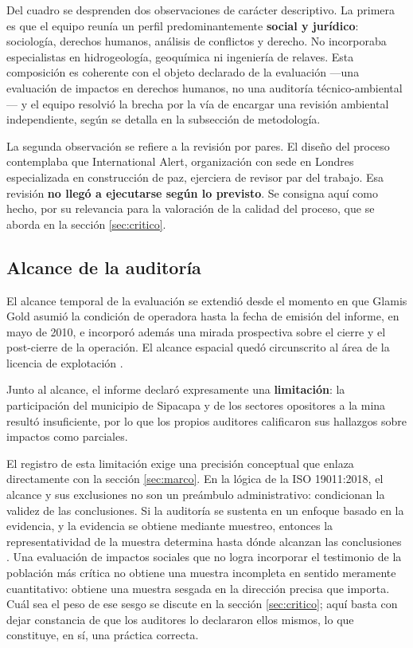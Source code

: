 Del cuadro se desprenden dos observaciones de carácter descriptivo. La primera es
que el equipo reunía un perfil predominantemente \textbf{social y jurídico}:
sociología, derechos humanos, análisis de conflictos y derecho. No incorporaba
especialistas en hidrogeología, geoquímica ni ingeniería de relaves. Esta
composición es coherente con el objeto declarado de la evaluación —una evaluación
de impactos en derechos humanos, no una auditoría técnico-ambiental— y el equipo
resolvió la brecha por la vía de encargar una revisión ambiental independiente,
según se detalla en la subsección de metodología.

La segunda observación se refiere a la revisión por pares. El diseño del proceso
contemplaba que International Alert, organización con sede en Londres
especializada en construcción de paz, ejerciera de revisor par del trabajo. Esa
revisión \textbf{no llegó a ejecutarse según lo previsto}. Se consigna aquí como
hecho, por su relevancia para la valoración de la calidad del proceso, que se
aborda en la sección \ref{sec:critico}.

\subsection{Alcance de la auditoría}

El alcance temporal de la evaluación se extendió desde el momento en que Glamis
Gold asumió la condición de operadora hasta la fecha de emisión del informe, en
mayo de 2010, e incorporó además una mirada prospectiva sobre el cierre y el
post-cierre de la operación. El alcance espacial quedó circunscrito al área de la
licencia de explotación \parencite{oncommonground2010hria}.

Junto al alcance, el informe declaró expresamente una \textbf{limitación}: la
participación del municipio de Sipacapa y de los sectores opositores a la mina
resultó insuficiente, por lo que los propios auditores calificaron sus hallazgos
sobre impactos como parciales.

El registro de esta limitación exige una precisión conceptual que enlaza
directamente con la sección \ref{sec:marco}. En la lógica de la ISO 19011:2018, el
alcance y sus exclusiones no son un preámbulo administrativo: condicionan la
validez de las conclusiones. Si la auditoría se sustenta en un enfoque basado en
la evidencia, y la evidencia se obtiene mediante muestreo, entonces la
representatividad de la muestra determina hasta dónde alcanzan las conclusiones
\parencite{iso2018iso19011}. Una evaluación de impactos sociales que no logra
incorporar el testimonio de la población más crítica no obtiene una muestra
incompleta en sentido meramente cuantitativo: obtiene una muestra sesgada en la
dirección precisa que importa. Cuál sea el peso de ese sesgo se discute en la
sección \ref{sec:critico}; aquí basta con dejar constancia de que los auditores lo
declararon ellos mismos, lo que constituye, en sí, una práctica correcta.

